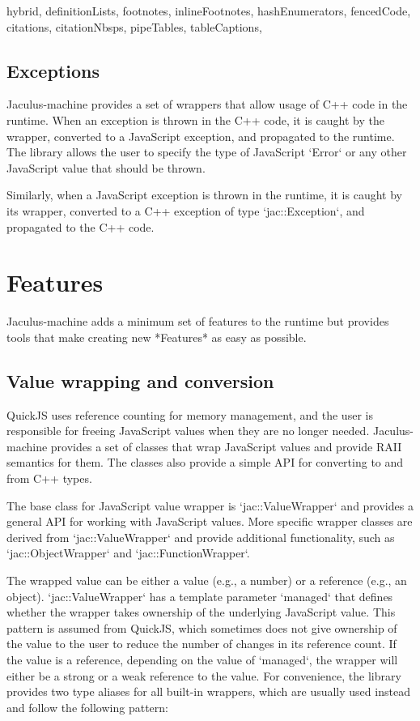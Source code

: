 \documentclass[
  digital,
  oneside,
  nosansbold,
  nocolorbold,
  lof,
  lot
]{fithesis4}
\begin{document}
\begin{markdown*}{%
  hybrid,
  definitionLists,
  footnotes,
  inlineFootnotes,
  hashEnumerators,
  fencedCode,
  citations,
  citationNbsps,
  pipeTables,
  tableCaptions,
}
\subsection{Exceptions}

Jaculus-machine provides a set of wrappers that allow usage of C++ code in the runtime. When an exception is thrown in the C++ code, it is caught by the wrapper, converted to a JavaScript exception, and propagated to the runtime. The library allows the user to specify the type of JavaScript `Error` or any other JavaScript value that should be thrown.

Similarly, when a JavaScript exception is thrown in the runtime, it is caught by its wrapper, converted to a C++ exception of type `jac::Exception`, and propagated to the C++ code.


\section{Features}

Jaculus-machine adds a minimum set of features to the runtime but provides tools that make creating new *Features* as easy as possible.

\subsection{Value wrapping and conversion}

QuickJS uses reference counting for memory management, and the user is responsible for freeing JavaScript values when they are no longer needed. Jaculus-machine provides a set of classes that wrap JavaScript values and provide RAII semantics for them. The classes also provide a simple API for converting to and from C++ types.

The base class for JavaScript value wrapper is `jac::ValueWrapper` and provides a general API for working with JavaScript values. More specific wrapper classes are derived from `jac::ValueWrapper` and provide additional functionality, such as `jac::ObjectWrapper` and `jac::FunctionWrapper`.

The wrapped value can be either a value (e.g., a number) or a reference (e.g., an object).
`jac::ValueWrapper` has a template parameter `managed` that defines whether the wrapper takes ownership of the underlying JavaScript value. This pattern is assumed from QuickJS, which sometimes does not give ownership of the value to the user to reduce the number of changes in its reference count. If the value is a reference, depending on the value of `managed`, the wrapper will either be a strong or a weak reference to the value. For convenience, the library provides two type aliases for all built-in wrappers, which are usually used instead and follow the following pattern:


\end{markdown*}
\end{document}
